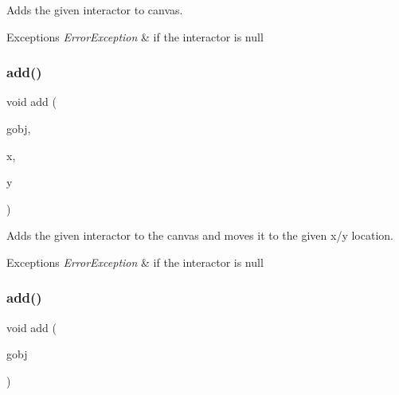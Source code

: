 Adds the given interactor to canvas. 


\begin{DoxyExceptions}{Exceptions}
{\em Error\+Exception} & if the interactor is null \\
\hline
\end{DoxyExceptions}
\mbox{\label{classsgl_1_1GCanvas_a8bb36f245efc7806414a1339c2befa1c}} 
\subsubsection{\texorpdfstring{add()}{add()}\hspace{0.1cm}{\footnotesize\ttfamily [2/4]}}
{\footnotesize\ttfamily void add (\begin{DoxyParamCaption}\item[{\mbox{\hyperlink{classsgl_1_1GObject}{G\+Object}} $\ast$}]{gobj,  }\item[{double}]{x,  }\item[{double}]{y }\end{DoxyParamCaption})\hspace{0.3cm}{\ttfamily [virtual]}}



Adds the given interactor to the canvas and moves it to the given x/y location. 


\begin{DoxyExceptions}{Exceptions}
{\em Error\+Exception} & if the interactor is null \\
\hline
\end{DoxyExceptions}
\mbox{\label{classsgl_1_1GCanvas_ac732fc2123d7a6d7e2de145fe9bbd8e8}} 
\subsubsection{\texorpdfstring{add()}{add()}\hspace{0.1cm}{\footnotesize\ttfamily [3/4]}}
{\footnotesize\ttfamily void add (\begin{DoxyParamCaption}\item[{\mbox{\hyperlink{classsgl_1_1GObject}{G\+Object}} \&}]{gobj }\end{DoxyParamCaption})\hspace{0.3cm}{\ttfamily [virtual]}}



